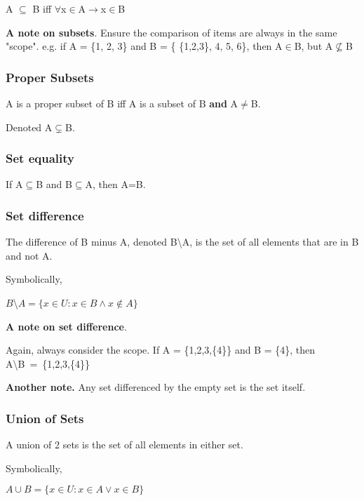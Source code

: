 \documentclass{article}
\begin{document}
\begin{center}
    A $\subseteq$ B iff $\forall$x$\in$A$\rightarrow$x$\in$B
\end{center}

\vspace{10pt}

\textbf{A note on subsets}.
Ensure the comparison of items are always in the same "scope".
e.g. if A = \{1, 2, 3\} and B = \{ \{1,2,3\}, 4, 5, 6\}, then A$\in$B, but A$\nsubseteq$B

\subsubsection{Proper Subsets}
A is a proper subset of B iff A is a subset of B \textbf{and} A$\neq$B.

Denoted A$\subsetneq$B.

\subsubsection{Set equality}
If A$\subseteq$B and B$\subseteq$A, then A=B.

\subsubsection{Set difference}
The difference of B minus A, denoted B\textbackslash A, is the set of all elements that are in B and not A.

Symbolically,
\begin{center}
    $B$\textbackslash $A = \{ x \in U : x \in B \wedge x \notin A \}$
\end{center}

\vspace{10pt}

\textbf{A note on set difference}.

Again, always consider the scope. If A = \{1,2,3,\{4\}\} and B = \{4\}, then \mbox{A\textbackslash B = \{1,2,3,\{4\}\}}

\textbf{Another note.} Any set differenced by the empty set is the set itself.

\subsubsection{Union of Sets}
A union of 2 sets is the set of all elements in either set.

Symbolically,
\begin{center}
    $A\cup B = \{ x \in U: x\in A \vee x\in B\}$
\end{center}
\end{document}
